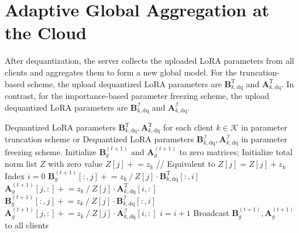 \documentclass[journal]{IEEEtran}
\begin{document}
\section{Adaptive Global Aggregation at the Cloud} 
After dequantization, the server collects the uploaded LoRA parameters from all clients and aggregates them to form a new global model. 
For the truncation-based scheme, the upload dequantized LoRA parameters are $\mathbf{B}_{k,\text{dq}}^{\text{T}}$ and $\mathbf{A}_{k,\text{dq}}^{\text{T}}$. In contrast, for the importance-based parameter freezing scheme, the upload dequantized LoRA parameters are $\mathbf{B}_{k,\text{dq}}^{\mathcal{I}}$ and $\mathbf{A}_{k,\text{dq}}^{\mathcal{I}}$.

\begin{algorithm}
\caption{Adaptive Aggregation of LoRA Parameters}
\label{alg:adaptive_aggregation}
\begin{algorithmic}[1]
\REQUIRE Dequantized LoRA parameters $\mathbf{B}_{k,\text{dq}}^{\text{T}}, \mathbf{A}_{k,\text{dq}}^{\text{T}}$ for each client $k \in \mathcal{K}$ in parameter truncation scheme or Dequantized LoRA parameters $\mathbf{B}_{k,\text{dq}}^{\mathcal{I}}, \mathbf{A}_{k,\text{dq}}^{\mathcal{I}}$ in parameter freezing scheme.
\STATE Initialize $\mathbf{B}_g^{(t+1)}$ and $\mathbf{A}_g^{(t+1)}$ to zero matrices; Initialize total norm list $Z$ with zero value
    \STATE $Z[j]\mathrel{+}=z_k$ \quad// Equivalent to $Z[j] = Z[j] + z_k$
\ENDFOR
\ENDFOR
{}
\STATE Index $i=0$
        \STATE $\mathbf{B}_g^{(t+1)}[:,j] \mathrel{+}= z_k\mathrel{/}Z[j]\cdot\mathbf{B}_{k,\text{dq}}^{\text{T}}[:,i]$
        \STATE $\mathbf{A}_g^{(t+1)}[j,:] \mathrel{+}= z_k\mathrel{/}Z[j]\cdot\mathbf{A}_{k,\text{dq}}^{\text{T}}[i,:]$
        \STATE $\mathbf{B}_g^{(t+1)}[:,j]\mathrel{+}=z_k\mathrel{/}Z[j]\cdot\mathbf{B}_{k,\text{dq}}^{\mathcal{I}}[:,i]$
        \STATE $\mathbf{A}_g^{(t+1)}[j,:]\mathrel{+}=z_k\mathrel{/}Z[j]\cdot\mathbf{A}_{k,\text{dq}}^{\mathcal{I}}[i,:]$
    \ENDIF
    \STATE $i=i+1$
\ENDFOR
\ENDFOR
\STATE Broadcast $\mathbf{B}_g^{(t+1)}, \mathbf{A}_g^{(t+1)}$ to all clients

\end{algorithmic}
\end{algorithm}
\end{document}
